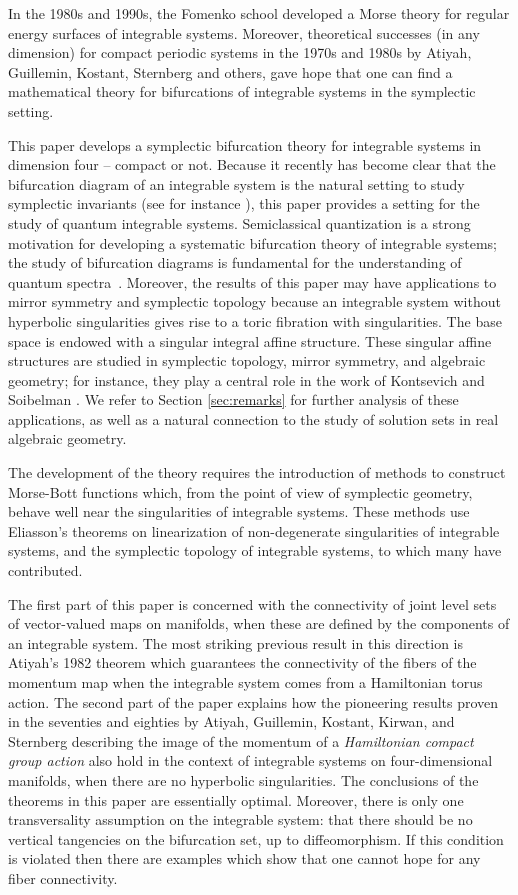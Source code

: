 \documentclass[11pt]{article}
\begin{document}
In the 1980s and 1990s, the Fomenko
school developed a Morse theory for regular energy surfaces of
integrable systems. Moreover, theoretical successes (in any dimension)
for compact periodic systems in the 1970s and 1980s by Atiyah,
Guillemin, Kostant, Sternberg and others, gave hope that one can find
a mathematical theory for bifurcations of integrable systems in the
symplectic setting. 


This paper develops a symplectic bifurcation theory for integrable
systems in dimension four -- compact or not.  Because it recently has
become clear that the bifurcation diagram of an integrable system is
the natural setting to study symplectic invariants (see for instance
\cite{PeVN2009, PeVN2010}), this paper provides a setting for the
study of quantum integrable systems.  Semiclassical quantization is a
strong motivation for developing a systematic bifurcation theory of
integrable systems; the study of bifurcation diagrams is fundamental
for the understanding of quantum spectra~\cite{CDV,lazutkin, Ze1998}.
Moreover, the results of this paper may have applications to mirror
symmetry and symplectic topology because an integrable system without
hyperbolic singularities gives rise to a toric fibration with
singularities. The base space is endowed with a singular integral
affine structure.  These singular affine structures are studied in
symplectic topology, mirror symmetry, and algebraic geometry; for
instance, they play a central role in the work of Kontsevich and
Soibelman \cite{KS}. We refer to Section \ref{sec:remarks} for further
analysis of these applications, as well as a natural connection to the
study of solution sets in real algebraic geometry.




The
development of the theory requires the introduction of methods to
construct Morse-Bott functions which, from the point of view of
symplectic geometry, behave well near the singularities of integrable
systems.  These methods use  Eliasson's
theorems on linearization of non-degenerate singularities of
integrable systems, and the symplectic topology of integrable systems, to which
many have contributed.


The first part of this paper is concerned with the connectivity of
joint level sets of vector-valued maps on manifolds, when these are
defined by the components of an integrable system.  The most striking
previous result in this direction is Atiyah's 1982 theorem which
guarantees the connectivity of the fibers of the momentum map when the
integrable system comes from a Hamiltonian torus action. The second
part of the paper explains how the pioneering results proven in the
seventies and eighties by Atiyah, Guillemin, Kostant, Kirwan, and
Sternberg describing the image of the momentum of a \emph{Hamiltonian
  compact group action} also hold in the context of integrable systems
on four-dimensional manifolds, when there are no hyperbolic
singularities.  The conclusions of the theorems in this paper are
essentially optimal. Moreover, there is only one transversality
assumption on the integrable system: that there should be no vertical
tangencies on the bifurcation set, up to diffeomorphism. If this
condition is violated then there are examples which show that one
cannot hope for any fiber connectivity.
\end{document}
